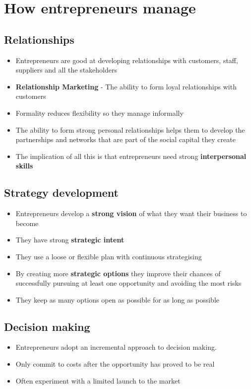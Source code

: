 \documentclass{article}[18pt]
\begin{document}
\section{How entrepreneurs manage}
\subsection{Relationships}
\begin{itemize}
\item Entrepreneurs are good at developing relationships with customers, staff, suppliers and all the stakeholders
\item \textbf{Relationship Marketing} - The ability to form loyal relationships with customers
\item Formality reduces flexibility so they manage informally
\item The ability to form strong personal relationships helps them to develop the partnerships and networks that are part of the social capital they create
\item The implication of all this is that entrepreneurs need strong \textbf{interpersonal skills}
\end{itemize}
\subsection{Strategy development}
\begin{itemize}
\item Entrepreneurs develop a \textbf{strong vision} of what they want their business to become
\item They have strong \textbf{strategic intent}
\item They use a loose or flexible plan with continuous strategising 
\item By creating more \textbf{strategic options} they improve their chances of successfully pursuing at least one opportunity and avoiding the most risks
\item They keep as many options open as possible for as long as possible
\end{itemize}
\subsection{Decision making}
\begin{itemize}
\item Entrepreneurs adopt an incremental approach to decision making. 
\item Only commit to costs after the opportunity has proved to be real
\item Often experiment with a limited launch to the market
\end{itemize}
\end{document}
